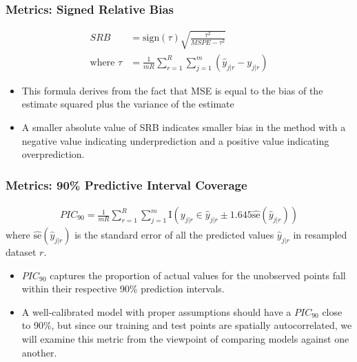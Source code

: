 \documentclass{beamer}
\begin{document}
\begin{frame}
	\frametitle{Metrics: Signed Relative Bias}
	\begin{align*}
		SRB &= \text{sign}(\tau) \sqrt{\frac{\tau^2}{MSPE - \tau^2}} \\
		\text{where }\tau &= \frac{1}{mR} \sum_{r = 1}^R \sum_{j = 1}^m (\hat{y}_{j|r} - y_{j|r})
	\end{align*}
	\begin{itemize}
		\item This formula derives from the fact that MSE is equal to the bias of the estimate squared plus the variance of the estimate
		\item A smaller absolute value of SRB indicates smaller bias in the method with a negative value indicating underprediction and a positive value indicating overprediction.\cite{verhoef13}
	\end{itemize}
\end{frame}

\begin{frame}
	\frametitle{Metrics: 90\% Predictive Interval Coverage}
	\begin{align*}
		PIC_{90} = \frac{1}{mR} \sum_{r=1}^R \sum_{j=1}^m \text{I}\left(y_{j|r} \in \hat{y}_{j|r} \pm 1.645\hat{\text{se}}(\hat{y}_{j|r}) \right)
	\end{align*}
	where $\hat{\text{se}}(\hat{y}_{j|r})$ is the standard error of all the predicted values $\hat{y}_{j|r}$ in resampled dataset $r$.\cite{verhoef13}
	\begin{itemize}
		\item $PIC_{90}$ captures the proportion of actual values for the unobserved points fall within their respective 90\% prediction intervals.
		\item A well-calibrated model with proper assumptions should have a $PIC_{90}$ close to 90\%, but since our training and test points are spatially autocorrelated, we will examine this metric from the viewpoint of comparing models against one another. 
	\end{itemize}
\end{frame}
\end{document}
